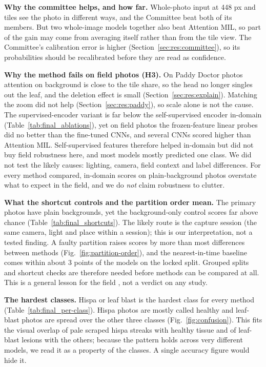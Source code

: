 \textbf{Why the committee helps, and how far.} Whole-photo input at 448 px and tiles see the photo in different ways, and
the Committee beat both of its members. But two whole-image models together also beat Attention MIL, so part of the gain may
come from averaging itself rather than from the tile view. The Committee's calibration error is higher
(Section~\ref{sec:res:committee}), so its probabilities should be recalibrated before they are read as confidence.

\textbf{Why the method fails on field photos (H3).} On Paddy Doctor photos attention on background is close to the tile
share, so the head no longer singles out the leaf, and the deletion effect is small (Section~\ref{sec:res:explain}).
Matching the zoom did not help (Section~\ref{sec:res:paddy}), so scale alone is not the cause. The supervised-encoder variant
is far below the self-supervised encoder in-domain (Table~\ref{tab:final_ablations}), yet on field photos the frozen-feature
linear probes did no better than the fine-tuned CNNs, and several CNNs scored higher than Attention MIL. Self-supervised
features therefore helped in-domain but did not buy field robustness here, and most models mostly predicted one class. We did
not test the likely causes: lighting, camera, field context and label differences. For every method compared, in-domain
scores on plain-background photos overstate what to expect in the field, and we do \emph{not} claim robustness to clutter.

\textbf{What the shortcut controls and the partition order mean.} The primary photos have plain backgrounds, yet the
background-only control scores far above chance (Table~\ref{tab:final_shortcuts}). The likely route is the capture session
(the same camera, light and place within a session); this is our interpretation, not a tested finding. A faulty partition
raises scores by more than most differences between methods (Fig.~\ref{fig:partition-order}), and the nearest-in-time
baseline comes within about 3 points of the models on the locked split. Grouped splits and shortcut checks are therefore
needed before methods can be compared at all. This is a general lesson for the field \cite{xu2024}, not a verdict on any study.

\textbf{The hardest classes.} Hispa or leaf blast is the hardest class for every method
(Table~\ref{tab:final_per-class}). Hispa photos are mostly called healthy and leaf-blast photos are spread over the other
three classes (Fig.~\ref{fig:confusion}). This fits the visual overlap of pale scraped hispa streaks with healthy tissue and
of leaf-blast lesions with the others; because the pattern holds across very different models, we read it as a property of
the classes. A single accuracy figure would hide it.

